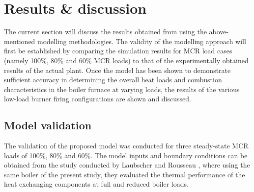 \documentclass[review]{elsarticle}
\begin{document}
\section{Results \& discussion}
The current section will discuss the results obtained from using the above-mentioned modelling methodologies. The validity of the modelling approach will first be established by comparing the simulation results for MCR load cases (namely 100\%, 80\% and 60\% MCR loads) to that of the experimentally obtained results of the actual plant. Once the model has been shown to demonstrate sufficient accuracy in determining the overall heat loads and combustion characteristics in the boiler furnace at varying loads, the results of the various low-load burner firing configurations are shown and discussed.

\subsection{Model validation}\label{sec_model_valid}
The validation of the proposed model was conducted for three steady-state MCR loads of 100\%, 80\% and 60\%. The model inputs and boundary conditions can be obtained from the study conducted by Laubscher and Rousseau \citep{Laubscher2019b}, where using the same boiler of the present study, they evaluated the thermal performance of the heat exchanging components at full and reduced boiler loads.
\end{document}
